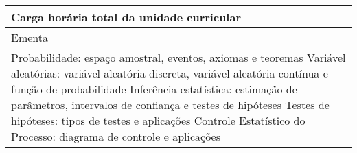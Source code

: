 \begin{quadro}[ht!]
\begin{tabular}{|p{3cm} p{2cm} p{3cm} p{2cm} p{3cm} p{2cm}|}
\multicolumn{5}{|p{13cm}|}{\cellcolor{blue1} Carga horária total da unidade curricular} & \multicolumn{1}{p{1cm}|}{\raggedleft 60	}\\\hline
\multicolumn{6}{|p{15cm}|}{\cellcolor{blue1} Ementa} \\\hline
\hline\multicolumn{6}{|p{15cm}|}{\scriptsize Probabilidade: espaço amostral, eventos, axiomas e teoremas Variável aleatórias: variável aleatória discreta, variável aleatória contínua e função de probabilidade Inferência estatística: estimação de parâmetros, intervalos de confiança e testes de hipóteses Testes de hipóteses: tipos de testes e aplicações Controle Estatístico do Processo: diagrama de controle e aplicações}\\\hline
\hline
	\end{tabular}
\end{quadro}
